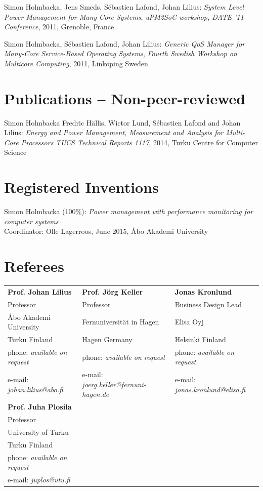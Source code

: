 \documentclass[margin,line]{resume}
\begin{document}
\begin{resume}
Simon Holmbacka, Jens Smeds, S\'{e}bastien Lafond, Johan Lilius:
\textit{System Level Power Management for Many-Core Systems},
\textsl{uPM2SoC workshop, DATE '11 Conference}, 2011, Grenoble, France

Simon Holmbacka, S\'{e}bastien Lafond, Johan Lilius: 
\textit{Generic QoS Manager for Many-Core Service-Based Operating Systems}, 
\textsl{Fourth Swedish Workshop on Multicore Computing}, 2011, Link\"{o}ping Sweden

\section{\mysidestyle Publications -- Non-peer-reviewed}
Simon Holmbacka Fredric H\"{a}llis, Wictor Lund, S\'{e}bastien Lafond and Johan Lilius:
\textit{Energy and Power Management, Measurement and Analysis for Multi-Core Processors} 
\textsl{TUCS Technical Reports 1117}, 2014, Turku Centre for Computer Science 

\section{\mysidestyle Registered Inventions}
Simon Holmbacka (100\%):
\textit{Power management with performance monitoring for computer systems}\\Coordinator: Olle Lagerroos, June 2015, \AA{}bo Akademi University
\clearpage
\section{\mysidestyle Referees} 

\begin{tabular}{@{}p{4.2cm}p{6cm}p{5cm}}
\textbf{Prof. Johan Lilius}       &  \textbf{Prof. J\"{o}rg Keller}	&  \textbf{Jonas Kronlund}                   \\
Professor                               &  Professor & Business Design Lead                       \\
\AA{}bo Akademi University                     &  Fernuniversit\"{a}t in Hagen   &   Elisa Oyj                 \\
Turku Finland			           &  Hagen Germany        & Helsinki Finland\\
phone: \textsl{available on request}    &  phone: \textsl{available on request}  &  phone: \textsl{available on request}      \\
e-mail: \textsl{johan.lilius@abo.fi}   &  e-mail: \textsl{joerg.keller@fernuni-hagen.de}  &  e-mail: \textsl{jonas.kronlund@elisa.fi}   \\
\vspace{0.5cm}
\textbf{Prof. Juha Plosila} & &\\
Professor & &\\
University of Turku & &\\
Turku Finland & &\\
phone: \textsl{available on request} & &\\
e-mail: \textsl{juplos@utu.fi} & &\\
\end{tabular}




\end{resume}
\end{document}
